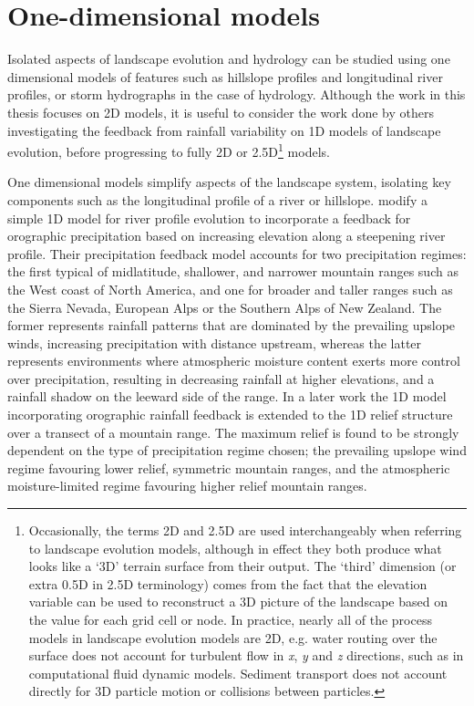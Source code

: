 \section{One-dimensional models}

Isolated aspects of landscape evolution and hydrology can be studied using one dimensional models of features such as hillslope profiles and longitudinal river profiles, or storm hydrographs in the case of hydrology. Although the work in this thesis focuses on 2D models, it is useful to consider the work done by others investigating the feedback from rainfall variability on 1D models of landscape evolution, before progressing to fully 2D or 2.5D\footnote{Occasionally, the terms 2D and 2.5D are used interchangeably when referring to landscape evolution models, although in effect they both produce what looks like a `3D' terrain surface from their output. The `third' dimension (or extra 0.5D in 2.5D terminology) comes from the fact that the elevation variable can be used to reconstruct a 3D picture of the landscape based on the value for each grid cell or node. In practice, nearly all of the process models in landscape evolution models are 2D, e.g. water routing over the surface does not account for turbulent flow in \textit{x}, \textit{y} and \textit{z} directions, such as in computational fluid dynamic models. Sediment transport does not account directly for 3D particle motion or collisions between particles.} models. 


One dimensional models simplify aspects of the landscape system, isolating key components such as the longitudinal profile of a river or hillslope. \citet{Roe2002} modify a simple 1D model for river profile evolution \citep{seidl1992problem,howard1994detachment} to incorporate a feedback for orographic precipitation based on increasing elevation along a steepening river profile. Their precipitation feedback model accounts for two precipitation regimes: the first typical of midlatitude, shallower, and narrower mountain ranges such as the West coast of North America, and one for broader and taller ranges such as the Sierra Nevada, European Alps or the Southern Alps of New Zealand. The former represents rainfall patterns that are dominated by the prevailing upslope winds, increasing precipitation with distance upstream, whereas the latter represents environments where atmospheric moisture content exerts more control over precipitation, resulting in decreasing rainfall at higher elevations, and a rainfall shadow on the leeward side of the range. In a later work \citep{Roe2003} the 1D model incorporating orographic rainfall feedback is extended to the 1D relief structure over a transect of a mountain range. The maximum relief is found to be strongly dependent on the type of precipitation regime chosen; the prevailing upslope wind regime favouring lower relief, symmetric mountain ranges, and the atmospheric moisture-limited regime favouring higher relief mountain ranges.

